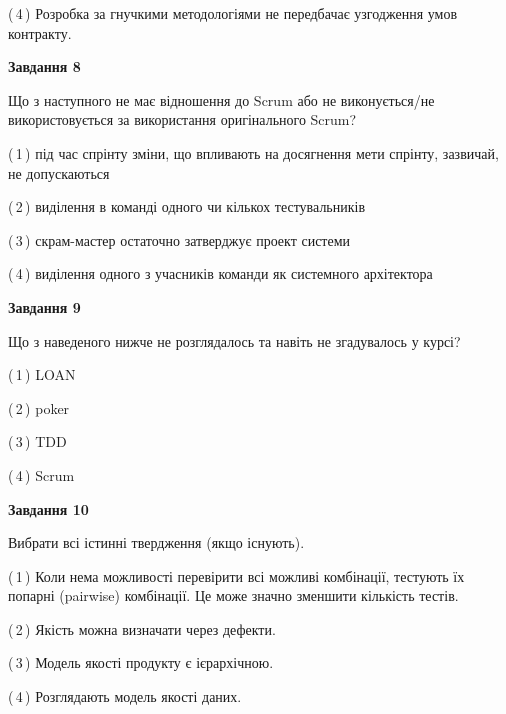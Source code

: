 \documentclass[10pt, ukrainian]{article}
\begin{document}
{\begin {large}
(\,4\,) Розробка за гнучкими методологіями не передбачає узгодження умов контракту. %


{\begin {center}\textbf{Завдання 8}\end {center}}\par
Що з наступного не має відношення до Scrum або не виконується/не використовується за використання оригінального Scrum?\par
\vspace{2mm}



(\,1\,) під час спрінту зміни, що впливають на досягнення мети спрінту, зазвичай, не допускаються%



(\,2\,) виділення в команді одного чи кількох тестувальників%



(\,3\,) скрам-мастер остаточно затверджує проект системи%



(\,4\,) виділення одного з учасників команди як системного архітектора%


{\begin {center}\textbf{Завдання 9}\end {center}}\par
Що з наведеного нижче не розглядалось та навіть не згадувалось у курсі?\par
\vspace{2mm}



(\,1\,) LOAN%



(\,2\,) poker%



(\,3\,) TDD%



(\,4\,) Scrum%


{\begin {center}\textbf{Завдання 10}\end {center}}\par
Вибрати всі істинні твердження (якщо існують).\par
\vspace{2mm}



(\,1\,) Коли нема можливості перевірити всі можливі комбінації, тестують їх попарні (pairwise) комбінації. Це може значно зменшити кількість тестів.%



(\,2\,) Якість можна визначати через дефекти.%



(\,3\,) Модель якості продукту є ієрархічною.%



(\,4\,) Розглядають модель якості даних.%



\end {large}}
\end{document}
